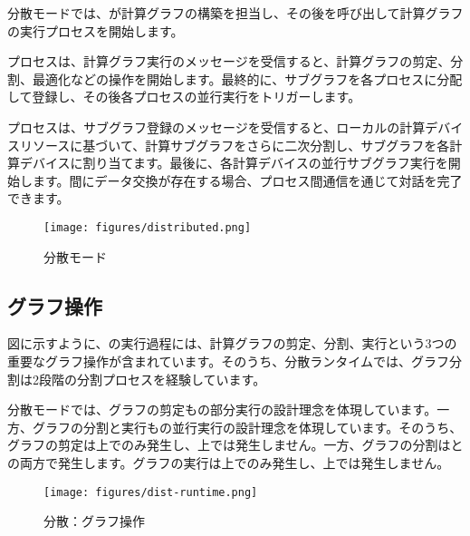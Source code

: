 \begin{content}

分散モードでは、が計算グラフの構築を担当し、その後を呼び出して計算グラフの実行プロセスを開始します。

プロセスは、計算グラフ実行のメッセージを受信すると、計算グラフの剪定、分割、最適化などの操作を開始します。最終的に、サブグラフを各プロセスに分配して登録し、その後各プロセスの並行実行をトリガーします。

プロセスは、サブグラフ登録のメッセージを受信すると、ローカルの計算デバイスリソースに基づいて、計算サブグラフをさらに二次分割し、サブグラフを各計算デバイスに割り当てます。最後に、各計算デバイスの並行サブグラフ実行を開始します。間にデータ交換が存在する場合、プロセス間通信を通じて対話を完了できます。

\begin{figure}[H]
\centering
\texttt{[image: figures/distributed.png]}
\caption{分散モード}
 \label{fig:distributed}
\end{figure}

\subsection{グラフ操作}

図に示すように、の実行過程には、計算グラフの剪定、分割、実行という3つの重要なグラフ操作が含まれています。そのうち、分散ランタイムでは、グラフ分割は2段階の分割プロセスを経験しています。

\begin{enum}
\end{enum}

分散モードでは、グラフの剪定も\tf{}の部分実行の設計理念を体現しています。一方、グラフの分割と実行も\tf{}の並行実行の設計理念を体現しています。そのうち、グラフの剪定は上でのみ発生し、上では発生しません。一方、グラフの分割はとの両方で発生します。グラフの実行は上でのみ発生し、上では発生しません。

\begin{figure}[H]
\centering
\texttt{[image: figures/dist-runtime.png]}
\caption{分散：グラフ操作}
 \label{fig:dist-runtime}
\end{figure}


\end{content}

